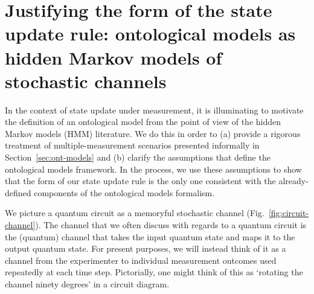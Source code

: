 \documentclass[%
 reprint, onecolumn, 12pt,
superscriptaddress,
nofootinbib,
 prx, 
]{quantumarticle}
\begin{document}
\section{Justifying the form of the state update rule: ontological
  models as hidden Markov models of stochastic channels}
\label{sec:hmm-appendix}



In the context of state update under measurement, it is illuminating
to motivate the definition of an ontological model from the point of
view of the hidden Markov models (HMM) literature. We do this in order
to (a) provide a rigorous treatment of multiple-measurement scenarios
presented informally in Section~\ref{sec:ont-models} and (b) clarify
the assumptions that define the ontological models framework. In the
process, we use these assumptions to show that the form of our state
update rule is the only one consistent with the already-defined
components of the ontological models formalism.

We picture a quantum circuit as a memoryful stochastic channel
(Fig.~\ref{fig:circuit-channel}). The channel that we often discuss
with regards to a quantum circuit is the (quantum) channel that takes
the input quantum state and maps it to the output quantum state. For
present purposes, we will instead think of it as a channel from the
experimenter to individual measurement outcomes used repeatedly at
each time step. Pictorially, one might think of this as `rotating the
channel ninety degrees' in a circuit diagram.
\end{document}
